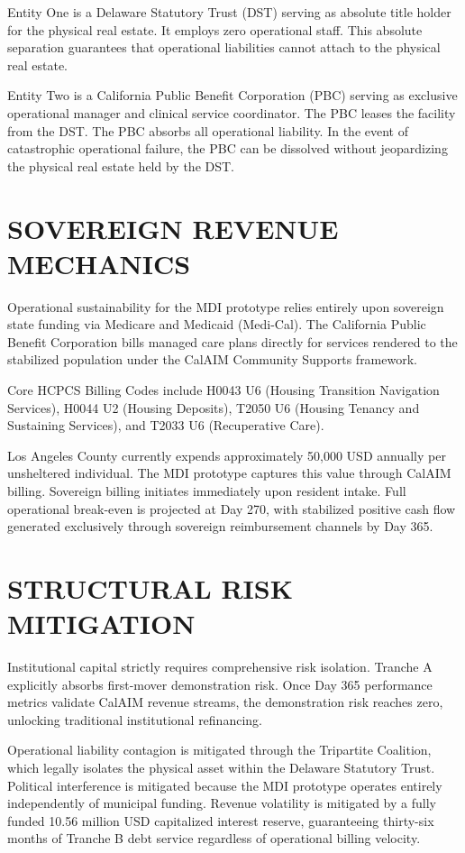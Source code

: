 \documentclass[12pt, letterpaper]{article}
\begin{document}
Entity One is a Delaware Statutory Trust (DST) serving as absolute title holder for the physical real estate. It employs zero operational staff. This absolute separation guarantees that operational liabilities cannot attach to the physical real estate. 

Entity Two is a California Public Benefit Corporation (PBC) serving as exclusive operational manager and clinical service coordinator. The PBC leases the facility from the DST. The PBC absorbs all operational liability. In the event of catastrophic operational failure, the PBC can be dissolved without jeopardizing the physical real estate held by the DST.

\clearpage
\section{SOVEREIGN REVENUE MECHANICS}
Operational sustainability for the MDI prototype relies entirely upon sovereign state funding via Medicare and Medicaid (Medi-Cal). The California Public Benefit Corporation bills managed care plans directly for services rendered to the stabilized population under the CalAIM Community Supports framework.

Core HCPCS Billing Codes include H0043 U6 (Housing Transition Navigation Services), H0044 U2 (Housing Deposits), T2050 U6 (Housing Tenancy and Sustaining Services), and T2033 U6 (Recuperative Care). 

Los Angeles County currently expends approximately 50,000 USD annually per unsheltered individual. The MDI prototype captures this value through CalAIM billing. Sovereign billing initiates immediately upon resident intake. Full operational break-even is projected at Day 270, with stabilized positive cash flow generated exclusively through sovereign reimbursement channels by Day 365.

\section{STRUCTURAL RISK MITIGATION}
Institutional capital strictly requires comprehensive risk isolation. Tranche A explicitly absorbs first-mover demonstration risk. Once Day 365 performance metrics validate CalAIM revenue streams, the demonstration risk reaches zero, unlocking traditional institutional refinancing.

Operational liability contagion is mitigated through the Tripartite Coalition, which legally isolates the physical asset within the Delaware Statutory Trust. Political interference is mitigated because the MDI prototype operates entirely independently of municipal funding. Revenue volatility is mitigated by a fully funded 10.56 million USD capitalized interest reserve, guaranteeing thirty-six months of Tranche B debt service regardless of operational billing velocity.
\end{document}
